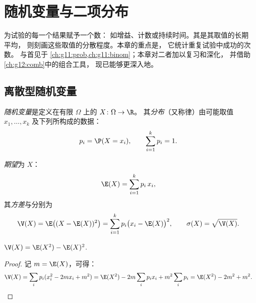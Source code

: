 \chapter{随机变量与二项分布}\label{ch:g12:randvar}

为试验的每一个结果赋予一个数：
如增益、计数或持续时间。其是其取值的长期平均，
则刻画这些取值的分散程度。本章的重点是，
它统计重复试验中成功的次数。
与首见于
\cref{ch:g11:prob,ch:g11:binom}；本章对二者加以复习和深化，
并借助\cref{ch:g12:comb}中的组合工具，
现已能够更深入地。

\section{离散型随机变量}

\begin{definition}[随机变量，分布]\label{def:g12:randvar:rv}
\emph{随机变量}是定义在有限
$\Omega$ 上的 $X \colon \Omega \to \R$。
其\emph{分布}（又称律）由可能取值
$x_1, \dots, x_k$ 及下列所构成的数据：
\[
p_i = \P(X = x_i), \qquad \sum_{i=1}^{k} p_i = 1 .
\]
\end{definition}

\begin{definition}[期望、方差与标准差]\label{def:g12:randvar:exp}
\emph{期望}为 $X$：
\[
\E(X) = \sum_{i=1}^{k} p_i\, x_i ,
\]
其\emph{方差}与\emph{}分别为
\[
\V(X) = \E\bigl((X - \E(X))^2\bigr) = \sum_{i=1}^k p_i\bigl(x_i - \E(X)\bigr)^2,
\qquad
\sigma(X) = \sqrt{\V(X)} .
\]
\end{definition}

\begin{proposition}\label{prop:g12:randvar:konig}
$\V(X) = \E(X^2) - \E(X)^2$.
\end{proposition}

\begin{proof}
记 $m = \E(X)$，可得：
\[
\V(X) = \sum_i p_i (x_i^2 - 2m x_i + m^2)
= \E(X^2) - 2m\sum_i p_i x_i + m^2\sum_i p_i
= \E(X^2) - 2m^2 + m^2 . \qedhere
\]
\end{proof}

